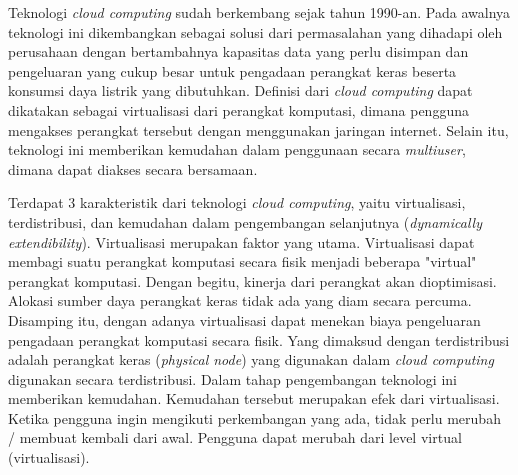 \hspace{0.5cm}Teknologi \textit{cloud computing} sudah berkembang sejak tahun 1990-an. Pada awalnya teknologi ini dikembangkan sebagai solusi dari permasalahan yang dihadapi oleh perusahaan dengan bertambahnya kapasitas data yang perlu disimpan dan pengeluaran yang cukup besar untuk pengadaan perangkat keras beserta konsumsi daya listrik yang dibutuhkan. Definisi dari \textit{cloud computing} dapat dikatakan sebagai virtualisasi dari perangkat komputasi, dimana pengguna mengakses perangkat tersebut dengan menggunakan jaringan internet. Selain itu, teknologi ini memberikan kemudahan dalam penggunaan secara \textit{multiuser}, dimana dapat diakses secara bersamaan.

Terdapat 3 karakteristik dari teknologi \textit{cloud computing}, yaitu virtualisasi, terdistribusi, dan kemudahan dalam pengembangan selanjutnya (\textit{dynamically extendibility}). Virtualisasi merupakan faktor yang utama. Virtualisasi dapat membagi suatu perangkat komputasi secara fisik menjadi beberapa "virtual" perangkat komputasi. Dengan begitu, kinerja dari perangkat akan dioptimisasi. Alokasi sumber daya perangkat keras tidak ada yang diam secara percuma. Disamping itu, dengan adanya virtualisasi dapat menekan biaya pengeluaran pengadaan perangkat komputasi secara fisik. Yang dimaksud dengan terdistribusi adalah perangkat keras (\textit{physical node}) yang digunakan dalam \textit{cloud computing} digunakan secara terdistribusi. Dalam tahap pengembangan teknologi ini memberikan kemudahan. Kemudahan tersebut merupakan efek dari virtualisasi. Ketika pengguna ingin mengikuti perkembangan yang ada, tidak perlu merubah / membuat kembali dari awal. Pengguna dapat merubah dari level virtual (virtualisasi).


